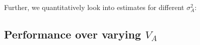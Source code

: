 \begin{Shaded}
\begin{Highlighting}[]
\NormalTok{(}
   \NormalTok{, } \NormalTok{, } \NormalTok{, } \NormalTok{,}
\SpecialCharTok{+} \NormalTok{(}
\NormalTok{  \},}
    \SpecialCharTok{+} 
\NormalTok{)}
\end{Highlighting}
\end{Shaded}

Further, we quantitatively look into estimates for different
\(\sigma^2_A\):

\hypertarget{performance-over-varying-v_a}{%
\subsection*{\texorpdfstring{Performance over varying
\(V_A\)}{Performance over varying V\_A}}\label{performance-over-varying-v_a}}

